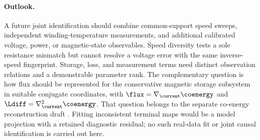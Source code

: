 \paragraph{Outlook.}
A future joint identification should combine common-support speed sweeps,
independent winding-temperature measurements, and additional calibrated
voltage, power, or magnetic-state observables. Speed diversity tests a sole
resistance mismatch but cannot resolve a voltage error with the same
inverse-speed fingerprint. Storage, loss, and measurement terms need distinct
observation relations and a demonstrable parameter rank.
The complementary question is how flux should be represented for the
conservative magnetic storage subsystem in suitable conjugate coordinates, with
$\flux=\nabla_{\current}\coenergy$ and
$\Ldiff=\nabla^2_{\current}\coenergy$. That question belongs to the separate
co-energy reconstruction draft \cite{companion-coenergy}. Fitting inconsistent
terminal maps would be a model projection with a retained diagnostic residual;
no such real-data fit or joint causal identification is carried out here.
